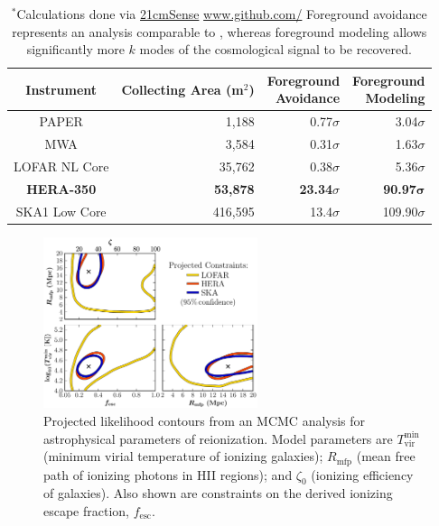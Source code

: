 \documentclass[preprint,11pt]{aastex}
\begin{document}
\begin{table}
\caption{\small Predicted SNRs of 21\,cm experiments for an EoR model with 50\% ionization at $z=9.5$, with 1080 hours observation, integrated over a $\Delta z$ of $0.8^*$.
}
\small
 \centering
 \begin{tabular}{c||r||r|r} 
\hline
Instrument & \shortstack{Collecting \\ Area (m$^2$)} & \shortstack{Foreground \\Avoidance} & \shortstack{Foreground \\Modeling} \\
\hline
PAPER & 1,188 & 0.77$\sigma$ & 3.04$\sigma$ \\
MWA & 3,584 & 0.31$\sigma$ & 1.63$\sigma$ \\
LOFAR NL Core & 35,762 & 0.38$\sigma$ & 5.36$\sigma$ \\
\textbf{HERA-350} & \textbf{53,878} & \textbf{23.34$\sigma$} & \textbf{90.97}$\boldsymbol{\sigma}$ \\
SKA1 Low Core & 416,595 & 13.4$\sigma$ & 109.90$\sigma$
\end{tabular}
\caption*{%
$^*$Calculations done via \url{21cmSense} \url{www.github.com/} \citep{2013AJ....145...65P,2014ApJ...782...66P}
Foreground avoidance represents an analysis comparable to \cite{ali_et_al2015}, whereas foreground modeling allows significantly more $k$ modes of the cosmological signal to be recovered.}
\label{tab:signif}
\end{table}


\begin{figure}[h!]
\centering
    \includegraphics[width=0.56\textwidth,clip]{plots/LikelihoodContours_smaller_avoid_All3_no_table}
  \caption{Projected likelihood contours from an MCMC analysis for astrophysical parameters of reionization. Model parameters are $T_\textrm{vir}^\textrm{min}$ (minimum virial temperature of ionizing galaxies); $R_\textrm{mfp}$ (mean free path of ionizing photons in HII regions); and $\zeta_0$ (ionizing efficiency of galaxies).  Also shown are constraints on the derived ionizing escape fraction, $f_\textrm{esc}$. }
	\label{fig:paramConstraints}
\end{figure}
 
\end{document}
